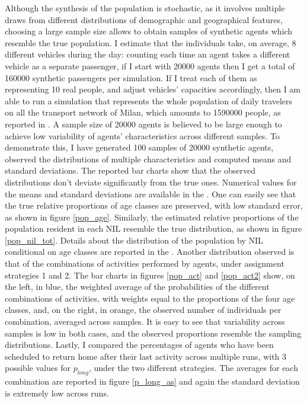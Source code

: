 Although the synthesis of the population is stochastic, as it involves multiple draws from different distributions of demographic and geographical features, choosing a large sample size allows to obtain samples of synthetic agents which resemble the true population. I estimate that the individuals take, on average, 8 different vehicles during the day: counting each time an agent takes a different vehicle as a separate passenger, if I start with 20000 agents then I get a total of 160000 synthetic passengers per simulation. If I treat each of them as representing 10 real people, and adjust vehicles' capacities accordingly, then I am able to run a simulation that represents the whole population of daily travelers on all the transport network of Milan, which amounts to 1590000 people, as reported in \cite{site20}. A sample size of 20000 agents is believed to be large enough to achieve low variability of agents' characteristics across different samples. To demonstrate this, I have generated 100 samples of 20000 synthetic agents, observed the distributions of multiple characteristics and computed means and standard deviations. The reported bar charts show that the observed distributions don't deviate significantly from the true ones. Numerical values for the means and standard deviations are available in the .
One can easily see that the true relative proportions of age classes are preserved, with low standard error, as shown in figure \ref{pop_age}. Similarly, the estimated relative proportions of the population resident in each NIL resemble the true distribution, as shown in figure \ref{pop_nil_tot}. Details about the distribution of the population by NIL conditional on age classes are reported in the . Another distribution observed is that of the combinations of activities performed by agents, under assignment strategies 1 and 2. The bar charts in figures \ref{pop_act} and \ref{pop_act2} show, on the left, in blue, the weighted average of the probabilities of the different combinations of activities, with weights equal to the proportions of the four age classes, and, on the right, in orange, the observed number of individuals per combination, averaged across samples. It is easy to see that variability across samples is low in both cases, and the observed proportions resemble the sampling distributions. Lastly, I compared the percentages of agents who have been scheduled to return home after their last activity across multiple runs, with 3 possible values for $p_{long}$, under the two different strategies. The averages for each combination are reported in figure \ref{p_long_as} and again the standard deviation is extremely low across runs.

